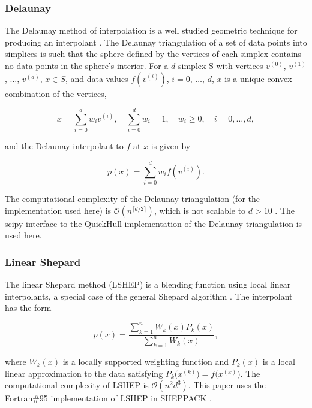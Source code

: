 \documentclass{scspaperproc}
\theoremstyle{scsthe}
\begin{document}
\vspace{-10pt}
\subsubsection{Delaunay}
\vspace{-10pt}
The Delaunay method of interpolation is a well studied geometric
technique for producing an interpolant . The
Delaunay triangulation of a set of data points into simplices is such
that the sphere defined by the vertices of each simplex contains no
data points in the sphere's interior. For a $d$-simplex S with
vertices $v^{(0)}$, $v^{(1)}$, $\ldots$, $v^{(d)}$, $x \in S$, and
data values $f(v^{(i)})$, $i=0$, $\ldots$, $d$, $x$ is a unique convex
combination of the vertices,

$$ x = \sum_{i=0}^{d} w_i v^{(i)}, \quad \sum_{i=0}^{d} w_i = 1, \quad
w_i \geq 0, \quad i=0,\ldots,d ,$$

and the Delaunay interpolant to $f$ at $x$ is given by

$$ p(x) = \sum_{i=0}^{d} w_i f(v^{(i)}). $$

The computational complexity of the Delaunay triangulation (for the
implementation used here) is $\mathcal{O}(n^{\lceil d/2 \rceil})$,
which is not scalable to $d > 10$ .
The scipy interface  to the QuickHull implementation
 of the Delaunay triangulation is used here.

\subsubsection{Linear Shepard}
\vspace{-10pt}
The linear Shepard method (LSHEP) is a blending function using local
linear interpolants, a special case of the general Shepard algorithm
. The interpolant has the form

$$ p(x) = \frac{\sum_{k=1}^{n}W_k(x)P_k(x)}{\sum_{k=1}^{n}W_k(x)} ,$$

where $W_k(x)$ is a locally supported weighting function and $P_k(x)$
is a local linear approximation to the data satisfying
$P_k\big(x^{(k)}\big) = f\big(x^{(x)}\big)$. The computational
complexity of LSHEP is $\mathcal{O}(n^2d^3)$. This paper uses the
Fortran\#95 implementation of LSHEP in SHEPPACK
.

\end{document}
